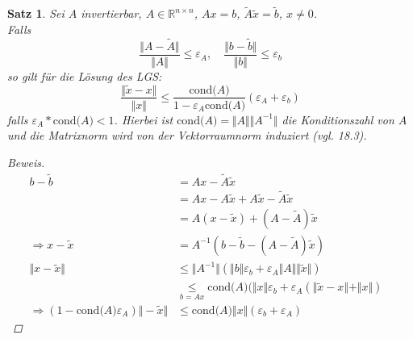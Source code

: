\documentclass[12pt]{article}
\theoremstyle{break}
\newtheorem{theorem}{Satz}[subsection]
\begin{document}
\begin{theorem}
Sei $A$ invertierbar, $A \in \mathbb{R}^{n \times n}$, $Ax = b$, $\tilde{A} \tilde{x} = \tilde{b}$, $x \neq 0$. \\
Falls 
$$ \frac{\Vert A - \tilde{A} \Vert}{\Vert A \Vert} \leq \varepsilon_A, \quad \frac{\Vert b - \tilde{b} \Vert}{\Vert b \Vert} \leq \varepsilon_b$$
so gilt für die Lösung des LGS:
$$\frac{\Vert \tilde{x} - x \Vert }{\Vert x \Vert} \leq \frac{\text{cond($A$)}}{1- \varepsilon_A \text{cond($A$)}}(\varepsilon_A + \varepsilon_b)$$
falls $\varepsilon_A *\text{cond($A$)} < 1$. Hierbei ist $\text{cond($A$)} = \Vert A \Vert \Vert A^{-1} \Vert$ die Konditionszahl von $A$ und die Matrixnorm wird von der Vektorraumnorm induziert (vgl. 18.3).
\begin{proof}[Beweis]
\begin{align*}
b - \tilde{b} &= Ax - \tilde{A}\tilde{x} &\\
&= Ax - A\tilde{x} + A\tilde{x} - \tilde{A}\tilde{x} &\\
&= A(x-\tilde{x}) + (A- \tilde{A})\tilde{x} &\\
\Rightarrow x- \tilde{x} &= A^{-1} (b -\tilde{b} - (A - \tilde{A})\tilde{x}) &\\
\Vert x - \tilde{x} \Vert & \leq \Vert A^{-1} \Vert ( \Vert b \Vert \varepsilon_b + \varepsilon_A \Vert A \Vert \Vert \tilde{x} \Vert ) &\\
& \underset{b=Ax}{\leq} \text{cond($A$)} ( \Vert x \Vert \varepsilon_b + \varepsilon_A (\Vert \tilde{x} - x \Vert + \Vert x \Vert) &\\
\Rightarrow (1- \text{cond($A$)} \varepsilon_A) \Vert - \tilde{x} \Vert & \leq \text{cond($A$)} \Vert x \Vert (\varepsilon_b + \varepsilon_A)
\end{align*}
\end{proof}
\end{theorem}
\end{document}
